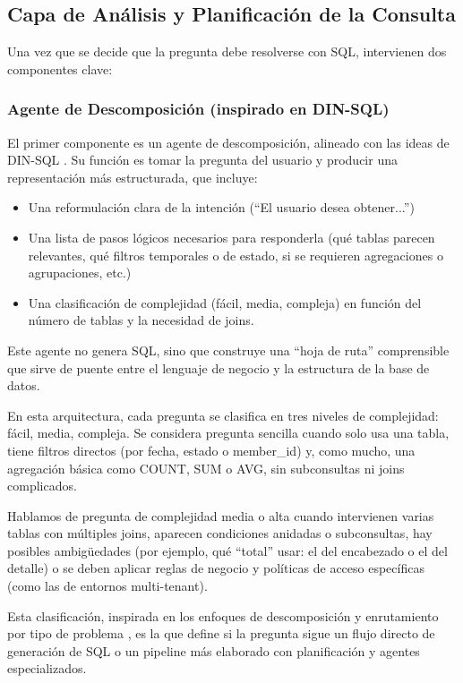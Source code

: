 \documentclass[journal]{IEEEtran}
\begin{document}
\subsection{Capa de Análisis y Planificación de la Consulta}

Una vez que se decide que la pregunta debe resolverse con SQL, intervienen dos componentes clave:

\subsubsection{Agente de Descomposición (inspirado en DIN-SQL)}

El primer componente es un agente de descomposición, alineado con las ideas de DIN-SQL \cite{pourreza2023din}. Su función es tomar la pregunta del usuario y producir una representación más estructurada, que incluye:
\begin{itemize}
	\item Una reformulación clara de la intención (``El usuario desea obtener...'')
	\item Una lista de pasos lógicos necesarios para responderla (qué tablas parecen relevantes, qué filtros temporales o de estado, si se requieren agregaciones o agrupaciones, etc.)
	\item Una clasificación de complejidad (fácil, media, compleja) en función del número de tablas y la necesidad de joins.
\end{itemize}

Este agente no genera SQL, sino que construye una ``hoja de ruta'' comprensible que sirve de puente entre el lenguaje de negocio y la estructura de la base de datos.

En esta arquitectura, cada pregunta se clasifica en tres niveles de complejidad: fácil, media, compleja. Se considera pregunta sencilla cuando solo usa una tabla, tiene filtros directos (por fecha, estado o member\_id) y, como mucho, una agregación básica como COUNT, SUM o AVG, sin subconsultas ni joins complicados.

Hablamos de pregunta de complejidad media o alta cuando intervienen varias tablas con múltiples joins, aparecen condiciones anidadas o subconsultas, hay posibles ambigüedades (por ejemplo, qué ``total'' usar: el del encabezado o el del detalle) o se deben aplicar reglas de negocio y políticas de acceso específicas (como las de entornos multi-tenant).

Esta clasificación, inspirada en los enfoques de descomposición y enrutamiento por tipo de problema \cite{pourreza2023din, xie2024dea}, es la que define si la pregunta sigue un flujo directo de generación de SQL o un pipeline más elaborado con planificación y agentes especializados.
\end{document}
